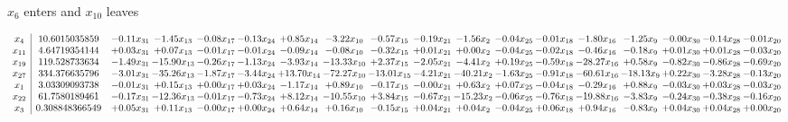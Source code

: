 \documentclass[9pt]{article}
\begin{document}
 $ x_{6} $ enters and $ x_{10} $ leaves 

 \[\begin{array}{c| c c@{\hskip 2pt} c@{\hskip 2pt} c@{\hskip 2pt} c@{\hskip 2pt} c@{\hskip 2pt} c@{\hskip 2pt} c@{\hskip 2pt} c@{\hskip 2pt} c@{\hskip 2pt} c@{\hskip 2pt} c@{\hskip 2pt} c@{\hskip 2pt} c@{\hskip 2pt} c@{\hskip 2pt} c@{\hskip 2pt} c@{\hskip 2pt} }
 x_{4}   &  10.6015035859 & -0.11 x_{31} & -1.45 x_{13} & -0.08 x_{17} & -0.13 x_{24} & +  0.85 x_{14} & -3.22 x_{10} & -0.57 x_{15} & -0.19 x_{21} & -1.56 x_{2} & -0.04 x_{25} & -0.01 x_{18} & -1.80 x_{16} & -1.25 x_{9} & -0.00 x_{30} & -0.14 x_{28} & -0.01 x_{20}\\
 x_{11}   &  4.64719354144 & +  0.03 x_{31} & +  0.07 x_{13} & -0.01 x_{17} & -0.01 x_{24} & -0.09 x_{14} & -0.08 x_{10} & -0.32 x_{15} & +  0.01 x_{21} & +  0.00 x_{2} & -0.04 x_{25} & -0.02 x_{18} & -0.46 x_{16} & -0.18 x_{9} & +  0.01 x_{30} & +  0.01 x_{28} & -0.03 x_{20}\\
 x_{19}   &  119.528733634 & -1.49 x_{31} & -15.90 x_{13} & -0.26 x_{17} & -1.13 x_{24} & -3.93 x_{14} & -13.33 x_{10} & +  2.37 x_{15} & -2.05 x_{21} & -4.41 x_{2} & +  0.19 x_{25} & -0.59 x_{18} & -28.27 x_{16} & +  0.58 x_{9} & -0.82 x_{30} & -0.86 x_{28} & -0.69 x_{20}\\
 x_{27}   &  334.376635796 & -3.01 x_{31} & -35.26 x_{13} & -1.87 x_{17} & -3.44 x_{24} & + 13.70 x_{14} & -72.27 x_{10} & -13.01 x_{15} & -4.21 x_{21} & -40.21 x_{2} & -1.63 x_{25} & -0.91 x_{18} & -60.61 x_{16} & -18.13 x_{9} & +  0.22 x_{30} & -3.28 x_{28} & -0.13 x_{20}\\
 x_{1}   &  3.03309093738 & -0.01 x_{31} & +  0.15 x_{13} & +  0.00 x_{17} & +  0.03 x_{24} & -1.17 x_{14} & +  0.89 x_{10} & -0.17 x_{15} & -0.00 x_{21} & +  0.63 x_{2} & +  0.07 x_{25} & -0.04 x_{18} & -0.29 x_{16} & +  0.88 x_{9} & -0.03 x_{30} & +  0.03 x_{28} & -0.03 x_{20}\\
 x_{22}   &  61.7580189461 & -0.17 x_{31} & -12.36 x_{13} & -0.01 x_{17} & -0.73 x_{24} & +  8.12 x_{14} & -10.55 x_{10} & +  3.84 x_{15} & -0.67 x_{21} & -15.23 x_{2} & -0.06 x_{25} & -0.76 x_{18} & -19.88 x_{16} & -3.83 x_{9} & -0.24 x_{30} & -0.38 x_{28} & -0.16 x_{20}\\
 x_{3}   &  0.308848366549 & +  0.05 x_{31} & +  0.11 x_{13} & -0.00 x_{17} & +  0.00 x_{24} & +  0.64 x_{14} & +  0.16 x_{10} & -0.15 x_{15} & +  0.04 x_{21} & +  0.04 x_{2} & -0.04 x_{25} & +  0.06 x_{18} & +  0.94 x_{16} & -0.83 x_{9} & +  0.04 x_{30} & +  0.04 x_{28} & +  0.00 x_{20}\\

\end{array}\]
\end{document}
